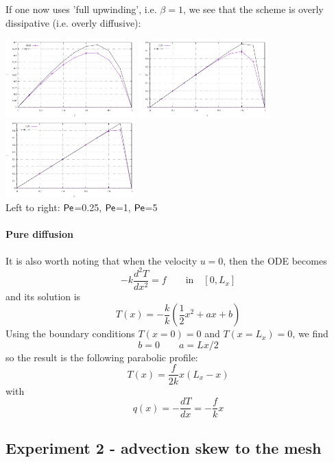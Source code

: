If one now uses 'full upwinding', i.e. $\beta=1$, we see that the scheme is 
overly dissipative (i.e. overly diffusive):

\begin{center}
\includegraphics[width=5cm]{python_codes/fieldstone_65/results/exp1/artdiff1/T1.pdf}
\includegraphics[width=5cm]{python_codes/fieldstone_65/results/exp1/artdiff1/T2.pdf}
\includegraphics[width=5cm]{python_codes/fieldstone_65/results/exp1/artdiff1/T3.pdf}\\
{\captionfont Left to right: ${\mathsf{Pe}}$=0.25, ${\mathsf{Pe}}$=1, ${\mathsf{Pe}}$=5}
\end{center}

\paragraph{Pure diffusion} It is also worth noting that when the velocity $u=0$, then the ODE becomes 
\begin{equation}
- k \frac{d^2T}{dx^2} = f \qquad \text{in} \quad [0,L_x]
\end{equation}
and its solution is 
\[
T(x)=-\frac{k}{k} (\frac{1}{2}x^2 + a x + b)
\]
Using the boundary conditions $T(x=0)=0$ and $T(x=L_x)=0$, we find
\[
b=0
\qquad
a = Lx/2
\]
so the result is the following parabolic profile: 
\[
T(x)=\frac{f}{2k}x(L_x-x)
\]
with 
\[
q(x)=-\frac{dT}{dx} = -\frac{f}{k}x
\]


\subsection*{Experiment 2 - advection skew to the mesh}

